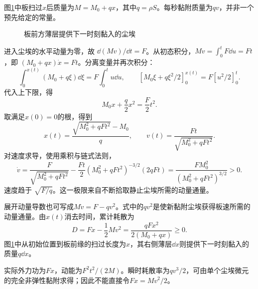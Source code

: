 \begin{solution}
图\ref{fig:hw3-3-s}中板扫过$x$后质量为$M=M_0+qx$，其中$q=\rho S$。每秒黏附质量为$qv$，并非一个预先给定的常量。

\begin{figure}[H]\centering
{}
\caption{板前方薄层提供下一时刻黏入的尘埃}\label{fig:hw3-3-s}
\end{figure}

进入尘埃的水平动量为零，故 $\dd(Mv)/\dd t=F$。从初态积分，$Mv=\int_0^tF\dd u=Ft$，即 $(M_0+qx)\dot x=Ft$。分离变量并再次积分：
\[
\int_0^{x(t)}(M_0+q\xi)\dd\xi=F\int_0^tu\dd u,
\qquad [M_0\xi+q\xi^2/2]_0^{x(t)}=F[u^2/2]_0^t.
\]
代入上下限，得
\[
 M_0x+\frac q2x^2=\frac F2t^2.
\]
取满足$x(0)=0$的根，得到
\[
 \boxed{x(t)=\frac{\sqrt{M_0^2+qFt^2}-M_0}{q},\qquad
 v(t)=\frac{Ft}{\sqrt{M_0^2+qFt^2}}}.
\]
对速度求导，使用乘积与链式法则，
\[
\dot v=\frac F{\sqrt{M_0^2+qFt^2}}
-\frac{Ft}{2}(M_0^2+qFt^2)^{-3/2}(2qFt)
=\frac{FM_0^2}{(M_0^2+qFt^2)^{3/2}}>0.
\]
速度趋于 $\sqrt{F/q}$。这一极限来自不断拾取静止尘埃所需的动量通量。

展开动量导数也可写成$M\dot v=F-qv^2$。式中的$qv^2$是使新黏附尘埃获得板速所需的动量通量。由$x(t)$消去时间，累计耗散为
\[
 D=Fx-\frac12Mv^2=\frac{qFx^2}{2(M_0+qx)}\ge0.
\]
图\ref{fig:hw3-3-s}中从初始位置到板前缘的扫过长度为$x$，其右侧薄层$\dd x$则提供下一时刻黏入的质量$q\dd x$。

实际外力功为$Fx$，动能为$F^2t^2/(2M)$。瞬时耗散率为$qv^3/2$，可由单个尘埃微元的完全非弹性黏附求得；因此不能直接令$Fx=Mv^2/2$。


\end{solution}



